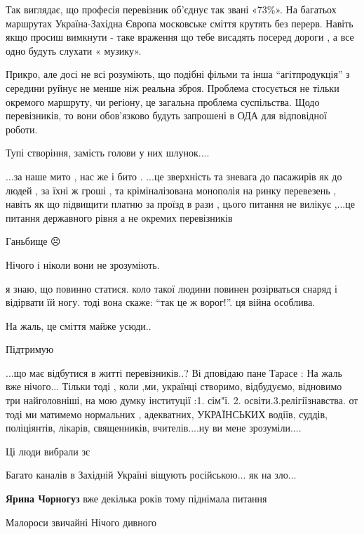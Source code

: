 \begin{itemize}
{Так виглядає, що професія перевізник об’єднує так звані «73\%». На багатьох
маршрутах Україна-Західна Європа московське сміття крутять без перерв. Навіть
якщо просиш вимкнути - таке враження що тебе висадять посеред дороги , а все
одно будуть слухати « музику».


Прикро, але досі не всі розуміють, що подібні фільми та інша \enquote{агітпродукція} з
середини руйнує не менше ніж реальна зброя. Проблема стосується не тільки
окремого маршруту, чи регіону, це загальна проблема суспільства. Щодо
перевізників, то вони обов'язково будуть запрошені в ОДА для відповідної
роботи.


Тупі створіння, замість голови у них шлунок....

...за наше мито , нас же і бито .
...це зверхність та зневага до пасажирів як до людей , за їхні ж гроші , та кріміналізована монополія на ринку перевезень , навіть як що підвищити платню за проїзд в рази , цього питання не вилікує ,...це питання державного рівня а не окремих перевізників

Ганьбище ☹️

Нічого і ніколи вони не зрозуміють.

я знаю, що повинно статися.
коло такої людини повинен розірваться снаряд і відірвати їй ногу. тоді вона скаже: \enquote{так це ж ворог!}.
ця війна особлива.

На жаль, це сміття майже усюди..

Підтримую


...що має відбутися в житті перевізників..? Ві дповідаю пане Тарасе : На жаль
вже нічого... Тільки тоді , коли ,ми, українці створимо, відбудуємо, відновимо
три найголовніші, на мою думку інституції :1. сім"ї. 2.
освіти.3.релігіїзнавства. от тоді ми матимемо нормальних , адекватних,
УКРАЇНСЬКИХ водіїв, суддів, поліціянтів, лікарів, священників, вчителів....ну
ви мене зрозуміли....


Ці люди вибрали зє

Багато каналів в Західній Україні віщують російською... як на зло...

\textbf{Ярина Чорногуз} вже декілька років тому піднімала питання

Малороси звичайні
Нічого дивного

}
\end{itemize}
